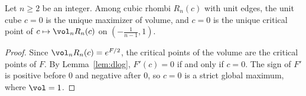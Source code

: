 \begin{theorem}\label{thm:main}
Let $n\ge2$ be an integer. Among cubic rhombi $R_n(c)$ with unit edges, the unit cube $c=0$ is the unique maximizer of volume, and $c=0$ is the unique critical point of $c\mapsto\vol_nR_n(c)$ on $(-\frac{1}{n-1},1)$.
\end{theorem}
\begin{proof}
Since $\vol_nR_n(c)=e^{F/2}$, the critical points of the volume are the critical points of $F$.
By Lemma~\ref{lem:dlog}, $F'(c)=0$ if and only if $c=0$.
The sign of $F'$ is positive before $0$ and negative after $0$, so $c=0$ is a strict global maximum, where $\vol=1$.
\end{proof}
